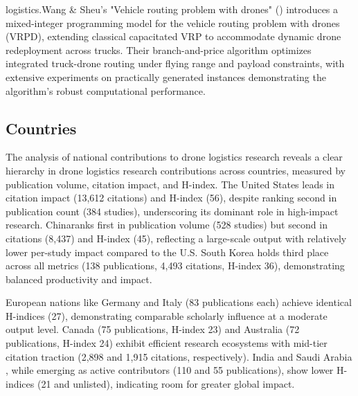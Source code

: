 \documentclass{article}
\begin{document}
logistics.Wang \& Sheu's "Vehicle routing problem with drones" (\cite{WOS:000465060600016}) introduces a mixed-integer programming model for the vehicle routing problem with drones (VRPD), extending classical capacitated VRP to accommodate dynamic drone redeployment across trucks. Their branch-and-price algorithm optimizes integrated truck-drone routing under flying range and payload constraints, with extensive experiments on practically generated instances demonstrating the algorithm’s robust computational performance.

\subsection{Countries}
The analysis of national contributions to drone logistics research reveals a clear hierarchy in drone logistics research contributions across countries, measured by publication volume, citation impact, and H-index. The ​​United States​​ leads in citation impact (13,612 citations) and H-index (56), despite ranking second in publication count (384 studies), underscoring its dominant role in high-impact research. ​​China​​ ranks first in publication volume (528 studies) but second in citations (8,437) and H-index (45), reflecting a large-scale output with relatively lower per-study impact compared to the U.S. ​​South Korea​​ holds third place across all metrics (138 publications, 4,493 citations, H-index 36), demonstrating balanced productivity and impact.

European nations like Germany and Italy (83 publications each) achieve identical H-indices (27), demonstrating comparable scholarly influence at a moderate output level. ​​Canada​​ (75 publications, H-index 23) and ​​Australia​​ (72 publications, H-index 24) exhibit efficient research ecosystems with mid-tier citation traction (2,898 and 1,915 citations, respectively). ​​India​​ and ​​Saudi Arabia​​, while emerging as active contributors (110 and 55 publications), show lower H-indices (21 and unlisted), indicating room for greater global impact.
\end{document}
